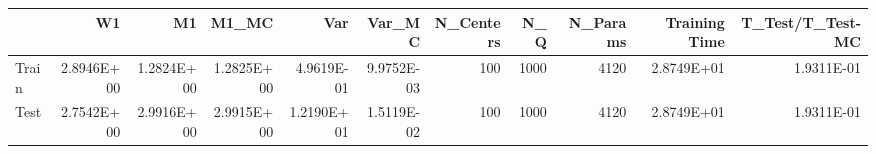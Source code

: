 \begin{tabular}{lrrrrrrrrrr}
\toprule
{} &         W1 &         M1 &      M1\_MC &        Var &     Var\_MC &  N\_Centers &   N\_Q &  N\_Params &  Training Time &  T\_Test/T\_Test-MC \\
\midrule
Train & 2.8946E+00 & 1.2824E+00 & 1.2825E+00 & 4.9619E-01 & 9.9752E-03 &        100 &  1000 &      4120 &     2.8749E+01 &        1.9311E-01 \\
Test  & 2.7542E+00 & 2.9916E+00 & 2.9915E+00 & 1.2190E+01 & 1.5119E-02 &        100 &  1000 &      4120 &     2.8749E+01 &        1.9311E-01 \\
\bottomrule
\end{tabular}
